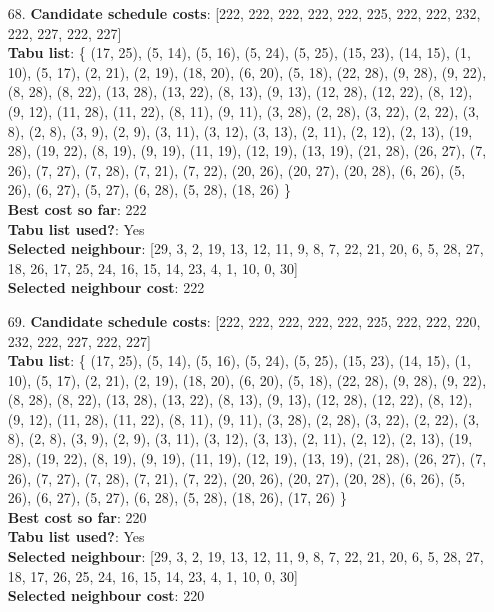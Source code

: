 \documentclass[fleqn]{article}
\begin{document}
\begin{itemize}
    \item[68.] \textbf{Candidate schedule costs}: [222, 222, 222, 222, 222, 225, 222, 222, 232, 222, 227, 222, 227] \\
    \textbf{Tabu list}: \{ (17, 25), (5, 14), (5, 16), (5, 24), (5, 25), (15, 23), (14, 15), (1, 10), (5, 17), (2, 21), (2, 19), (18, 20), (6, 20), (5, 18), (22, 28), (9, 28), (9, 22), (8, 28), (8, 22), (13, 28), (13, 22), (8, 13), (9, 13), (12, 28), (12, 22), (8, 12), (9, 12), (11, 28), (11, 22), (8, 11), (9, 11), (3, 28), (2, 28), (3, 22), (2, 22), (3, 8), (2, 8), (3, 9), (2, 9), (3, 11), (3, 12), (3, 13), (2, 11), (2, 12), (2, 13), (19, 28), (19, 22), (8, 19), (9, 19), (11, 19), (12, 19), (13, 19), (21, 28), (26, 27), (7, 26), (7, 27), (7, 28), (7, 21), (7, 22), (20, 26), (20, 27), (20, 28), (6, 26), (5, 26), (6, 27), (5, 27), (6, 28), (5, 28), (18, 26) \} \\
    \textbf{Best cost so far}: 222 \\
    \textbf{Tabu list used?}: Yes \\
    \textbf{Selected neighbour}: [29, 3, 2, 19, 13, 12, 11, 9, 8, 7, 22, 21, 20, 6, 5, 28, 27, 18, 26, 17, 25, 24, 16, 15, 14, 23, 4, 1, 10, 0, 30] \\
    \textbf{Selected neighbour cost}: 222
      

    \item[69.] \textbf{Candidate schedule costs}: [222, 222, 222, 222, 222, 225, 222, 222, 220, 232, 222, 227, 222, 227] \\
    \textbf{Tabu list}: \{ (17, 25), (5, 14), (5, 16), (5, 24), (5, 25), (15, 23), (14, 15), (1, 10), (5, 17), (2, 21), (2, 19), (18, 20), (6, 20), (5, 18), (22, 28), (9, 28), (9, 22), (8, 28), (8, 22), (13, 28), (13, 22), (8, 13), (9, 13), (12, 28), (12, 22), (8, 12), (9, 12), (11, 28), (11, 22), (8, 11), (9, 11), (3, 28), (2, 28), (3, 22), (2, 22), (3, 8), (2, 8), (3, 9), (2, 9), (3, 11), (3, 12), (3, 13), (2, 11), (2, 12), (2, 13), (19, 28), (19, 22), (8, 19), (9, 19), (11, 19), (12, 19), (13, 19), (21, 28), (26, 27), (7, 26), (7, 27), (7, 28), (7, 21), (7, 22), (20, 26), (20, 27), (20, 28), (6, 26), (5, 26), (6, 27), (5, 27), (6, 28), (5, 28), (18, 26), (17, 26) \} \\
    \textbf{Best cost so far}: 220 \\
    \textbf{Tabu list used?}: Yes \\
    \textbf{Selected neighbour}: [29, 3, 2, 19, 13, 12, 11, 9, 8, 7, 22, 21, 20, 6, 5, 28, 27, 18, 17, 26, 25, 24, 16, 15, 14, 23, 4, 1, 10, 0, 30] \\
    \textbf{Selected neighbour cost}: 220
      


\end{itemize}
\end{document}
